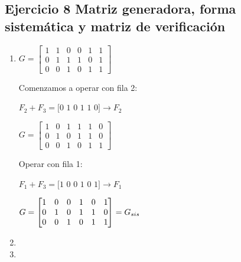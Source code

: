 \documentclass[11pt,fleqn]{article}
\begin{document}
\subsection*{Ejercicio 8 Matriz generadora, forma sistemática y matriz de verificación}
\begin{enumerate}[label=\alph*)]
\item {}

$
G=
\begin{bmatrix}
1&1&0&0&1&1\\
0&1&1&1&0&1\\
0&0&1&0&1&1
\end{bmatrix}
$

Comenzamos a operar con fila 2:

$F_2+F_3=\text{[0 1 0 1 1 0]}\rightarrow F_2$

$
G=
\begin{bmatrix}
    1&0&1&1&1&0\\
    0&1&0&1&1&0\\
    0&0&1&0&1&1
\end{bmatrix}
$

Operar con fila 1:

$F_1+F_3=\text{[1 0 0 1 0 1]}\rightarrow F_1$

$
G=
\begin{bmatrix}
1&0&0&1&0&1\\
0&1&0&1&1&0\\
0&0&1&0&1&1
\end{bmatrix}=G_{sis} \\ \\
$

\item {}

\item {}


\end{enumerate}
\end{document}
